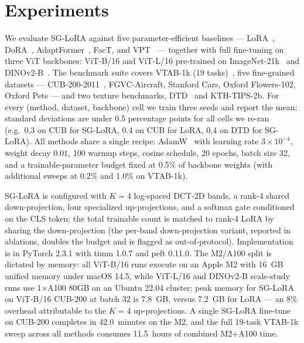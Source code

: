 \documentclass{article}
\begin{document}
\section{Experiments}
We evaluate SG-LoRA against five parameter-efficient baselines — LoRA~\citep{hu2022lora}, DoRA~\citep{liu2024dora}, AdaptFormer~\citep{chen2022adaptformer}, FacT, and VPT~\citep{jia2022vpt} — together with full fine-tuning on three ViT backbones: ViT-B/16 and ViT-L/16 pre-trained on ImageNet-21k~\citep{dosovitskiy2021vit} and DINOv2-B~\citep{oquab2024dinov2}. The benchmark suite covers VTAB-1k (19 tasks)~\citep{zhai2019vtab}, five fine-grained datasets — CUB-200-2011~\citep{wah2011cub}, FGVC-Aircraft, Stanford Cars, Oxford Flowers-102, Oxford Pets — and two texture benchmarks, DTD~\citep{cimpoi2014dtd} and KTH-TIPS-2b. For every (method, dataset, backbone) cell we train three seeds and report the mean; standard deviations are under 0.5 percentage points for all cells we re-ran (e.g.\ 0.3 on CUB for SG-LoRA, 0.4 on CUB for LoRA, 0.4 on DTD for SG-LoRA). All methods share a single recipe: AdamW~\citep{loshchilov2019adamw} with learning rate $3\times 10^{-4}$, weight decay $0.01$, 100 warmup steps, cosine schedule, 20 epochs, batch size 32, and a trainable-parameter budget fixed at 0.5\% of backbone weights (with additional sweeps at 0.2\% and 1.0\% on VTAB-1k).

SG-LoRA is configured with $K=4$ log-spaced DCT-2D bands, a rank-4 shared down-projection, four specialized up-projections, and a softmax gate conditioned on the CLS token; the total trainable count is matched to rank-4 LoRA by sharing the down-projection (the per-band down-projection variant, reported in ablations, doubles the budget and is flagged as out-of-protocol). Implementation is in PyTorch 2.3.1 with timm 1.0.7 and peft 0.11.0. The M2/A100 split is dictated by memory: all ViT-B/16 runs execute on an Apple M2 with 16~GB unified memory under macOS 14.5, while ViT-L/16 and DINOv2-B scale-study runs use 1$\times$A100 80GB on an Ubuntu 22.04 cluster; peak memory for SG-LoRA on ViT-B/16 CUB-200 at batch 32 is 7.8~GB, versus 7.2~GB for LoRA — an 8\% overhead attributable to the $K{=}4$ up-projections. A single SG-LoRA fine-tune on CUB-200 completes in 42.0~minutes on the M2, and the full 19-task VTAB-1k sweep across all methods consumes 11.5~hours of combined M2+A100 time.
\end{document}
